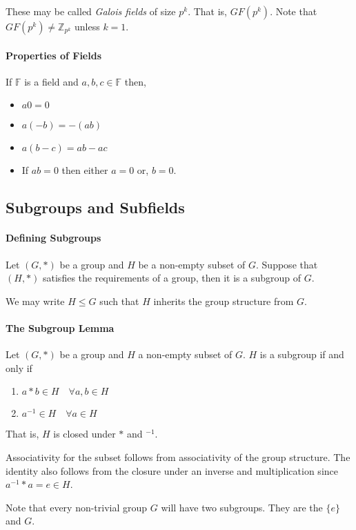 These may be called \textit{Galois fields} of size \(p^k\). That is,
\(GF(p^k)\).
Note that \(GF(p^k) \neq \mathbb{Z}_{p^k}\) unless \(k = 1\).

\paragraph{Properties of Fields}
If \(\mathbb{F}\) is a field and \(a, b, c \in \mathbb{F}\) then,
\begin{itemize}
    \item \(a0 = 0\)
    \item \(a(-b) = -(ab)\)
    \item \(a(b-c) = ab - ac\)
    \item If \(ab = 0\) then either \(a = 0\) or, \(b = 0\).
\end{itemize}

\subsection{Subgroups and Subfields}

\paragraph{Defining Subgroups}
Let \((G, *)\)  be a group and \(H\) be a non-empty subset of \(G\).
Suppose that \((H, *)\) satisfies the requirements of a group, then it is a
subgroup of \(G\).

We may write \(H \leq G\) such that \(H\) inherits the group structure from 
\(G\).

\paragraph{The Subgroup Lemma}
Let \((G, *)\) be a group and \(H\) a non-empty subset of \(G\).
\(H\) is a subgroup if and only if
\begin{enumerate}
    \item \(a*b \in H \quad \forall a,b \in H\)
    \item \(a^{-1} \in H \quad \forall a\in H\)
\end{enumerate}
That is, \(H\) is closed under \(*\) and \( ^{-1}\).

Associativity for the subset follows from associativity of the group
structure. The identity also follows from the closure under an inverse
and multiplication since \(a^{-1}*a = e \in H\).

Note that every non-trivial group \(G\) will have two subgroups.
They are the \(\{e\}\) and \(G\).

